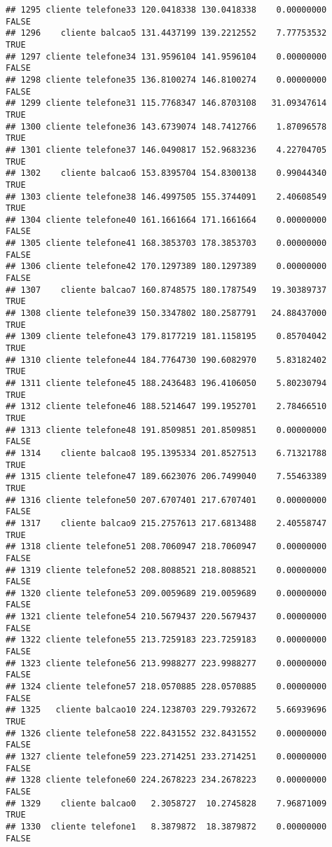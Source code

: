 \documentclass[
]{article}
\begin{document}
\begin{verbatim}
## 1295 cliente telefone33 120.0418338 130.0418338    0.00000000    FALSE
## 1296    cliente balcao5 131.4437199 139.2212552    7.77753532     TRUE
## 1297 cliente telefone34 131.9596104 141.9596104    0.00000000    FALSE
## 1298 cliente telefone35 136.8100274 146.8100274    0.00000000    FALSE
## 1299 cliente telefone31 115.7768347 146.8703108   31.09347614     TRUE
## 1300 cliente telefone36 143.6739074 148.7412766    1.87096578     TRUE
## 1301 cliente telefone37 146.0490817 152.9683236    4.22704705     TRUE
## 1302    cliente balcao6 153.8395704 154.8300138    0.99044340     TRUE
## 1303 cliente telefone38 146.4997505 155.3744091    2.40608549     TRUE
## 1304 cliente telefone40 161.1661664 171.1661664    0.00000000    FALSE
## 1305 cliente telefone41 168.3853703 178.3853703    0.00000000    FALSE
## 1306 cliente telefone42 170.1297389 180.1297389    0.00000000    FALSE
## 1307    cliente balcao7 160.8748575 180.1787549   19.30389737     TRUE
## 1308 cliente telefone39 150.3347802 180.2587791   24.88437000     TRUE
## 1309 cliente telefone43 179.8177219 181.1158195    0.85704042     TRUE
## 1310 cliente telefone44 184.7764730 190.6082970    5.83182402     TRUE
## 1311 cliente telefone45 188.2436483 196.4106050    5.80230794     TRUE
## 1312 cliente telefone46 188.5214647 199.1952701    2.78466510     TRUE
## 1313 cliente telefone48 191.8509851 201.8509851    0.00000000    FALSE
## 1314    cliente balcao8 195.1395334 201.8527513    6.71321788     TRUE
## 1315 cliente telefone47 189.6623076 206.7499040    7.55463389     TRUE
## 1316 cliente telefone50 207.6707401 217.6707401    0.00000000    FALSE
## 1317    cliente balcao9 215.2757613 217.6813488    2.40558747     TRUE
## 1318 cliente telefone51 208.7060947 218.7060947    0.00000000    FALSE
## 1319 cliente telefone52 208.8088521 218.8088521    0.00000000    FALSE
## 1320 cliente telefone53 209.0059689 219.0059689    0.00000000    FALSE
## 1321 cliente telefone54 210.5679437 220.5679437    0.00000000    FALSE
## 1322 cliente telefone55 213.7259183 223.7259183    0.00000000    FALSE
## 1323 cliente telefone56 213.9988277 223.9988277    0.00000000    FALSE
## 1324 cliente telefone57 218.0570885 228.0570885    0.00000000    FALSE
## 1325   cliente balcao10 224.1238703 229.7932672    5.66939696     TRUE
## 1326 cliente telefone58 222.8431552 232.8431552    0.00000000    FALSE
## 1327 cliente telefone59 223.2714251 233.2714251    0.00000000    FALSE
## 1328 cliente telefone60 224.2678223 234.2678223    0.00000000    FALSE
## 1329    cliente balcao0   2.3058727  10.2745828    7.96871009     TRUE
## 1330  cliente telefone1   8.3879872  18.3879872    0.00000000    FALSE

\end{verbatim}
\end{document}
